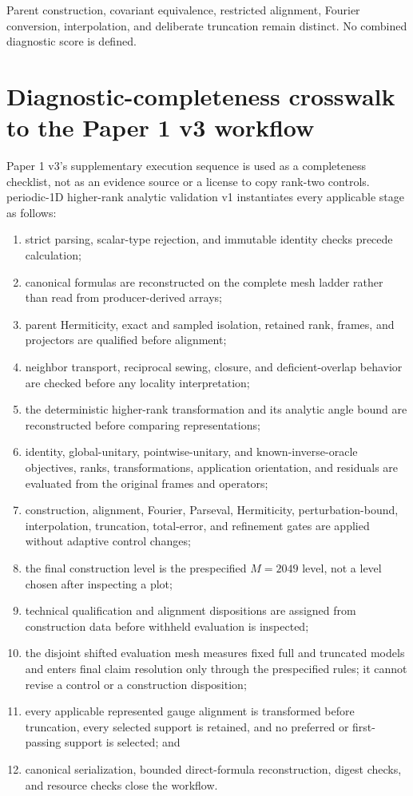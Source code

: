 \documentclass[11pt]{article}
\begin{document}
Parent construction, covariant equivalence, restricted alignment, Fourier conversion,
interpolation, and deliberate truncation remain distinct. No combined diagnostic score
is defined.

\section{Diagnostic-completeness crosswalk to the Paper 1 v3 workflow}

Paper 1 v3's supplementary execution sequence is used as a completeness checklist, not
as an evidence source or a license to copy rank-two controls. periodic-1D higher-rank analytic validation v1 instantiates every
applicable stage as follows:

\begin{enumerate}
\item strict parsing, scalar-type rejection, and immutable identity checks precede
      calculation;
\item canonical formulas are reconstructed on the complete mesh ladder rather than read
      from producer-derived arrays;
\item parent Hermiticity, exact and sampled isolation, retained rank, frames, and
      projectors are qualified before alignment;
\item neighbor transport, reciprocal sewing, closure, and deficient-overlap behavior are
      checked before any locality interpretation;
\item the deterministic higher-rank transformation and its analytic angle bound are reconstructed
      before comparing representations;
\item identity, global-unitary, pointwise-unitary, and known-inverse-oracle objectives, ranks, transformations, application orientation, and residuals
      are evaluated from the original frames and operators;
\item construction, alignment, Fourier, Parseval, Hermiticity, perturbation-bound,
      interpolation, truncation, total-error, and refinement gates are applied without
      adaptive control changes;
\item the final construction level is the prespecified $M=2049$ level, not a level chosen
      after inspecting a plot;
\item technical qualification and alignment dispositions are assigned from construction
data before withheld evaluation is inspected;
\item the disjoint shifted evaluation mesh measures fixed full and truncated models and
enters final claim resolution only through the prespecified rules; it cannot revise a
control or a construction disposition;
\item every applicable represented gauge alignment is transformed before truncation, every selected
      support is retained, and no preferred or first-passing support is selected; and
\item canonical serialization, bounded direct-formula reconstruction, digest checks,
      and resource checks close the workflow.
\end{enumerate}
\end{document}
